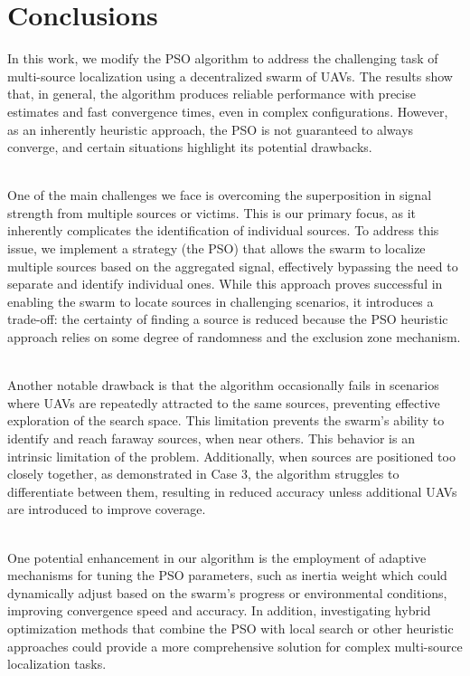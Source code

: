 \documentclass[main]{subfiles}
\begin{document}
\section{Conclusions}
In this work, we modify the PSO algorithm to address the challenging
task of multi-source localization using a decentralized swarm of UAVs.
The results show that, in general, the algorithm produces reliable
performance with precise estimates and fast convergence times, even in
complex configurations. However, as an inherently heuristic approach,
the PSO is not guaranteed to always converge, and certain situations
highlight its potential drawbacks.

\noindent\\
One of the main challenges we face is overcoming the superposition in
signal strength from multiple sources or victims. This is our primary
focus, as it inherently complicates the identification of individual
sources. To address this issue, we implement a strategy (the PSO) that
allows the swarm to localize multiple sources based on the aggregated
signal, effectively bypassing the need to separate and identify
individual ones. While this approach proves successful in enabling the
swarm to locate sources in challenging scenarios, it introduces a
trade-off: the certainty of finding a source is reduced because the PSO
heuristic approach relies on some degree of randomness and the exclusion
zone mechanism.

\noindent\\
Another notable drawback is that the algorithm occasionally fails in
scenarios where UAVs are repeatedly attracted to the same sources,
preventing effective exploration of the search space. This limitation
prevents the swarm's ability to identify and reach faraway
sources, when near others. This behavior is an intrinsic limitation of 
the problem. Additionally, when sources
are positioned too closely together, as demonstrated in Case 3, the
algorithm struggles to differentiate between them, resulting in reduced
accuracy unless additional UAVs are introduced to improve coverage.

\noindent\\
One potential enhancement in our algorithm is the employment of adaptive mechanisms 
for tuning the PSO parameters, such as inertia weight 
which could dynamically adjust based on the swarm's progress or environmental 
conditions, improving convergence speed and accuracy.
In addition, investigating hybrid optimization methods that combine 
the PSO with local search or other heuristic approaches could provide a more 
comprehensive solution for complex multi-source localization tasks.
\end{document}
